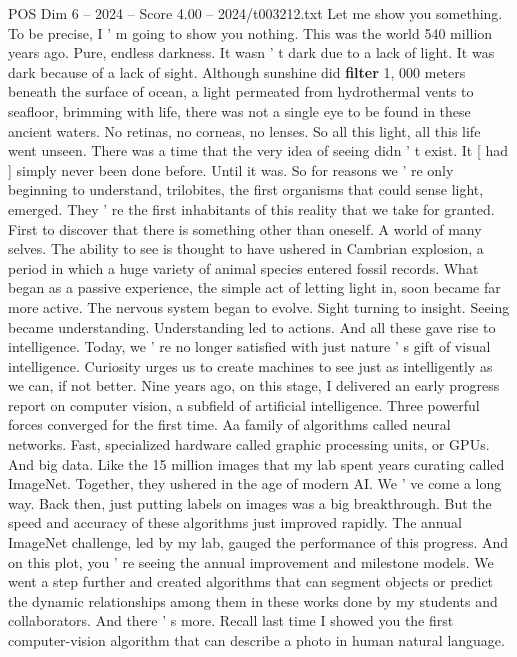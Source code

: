 \begin{textsample}{POS Dim 6 – 2024 – Score 4.00 – 2024/t003212.txt}  \label{ex:f6_pos_074}
Let me show you something.
To be precise, I ' m going to show you nothing.
This was the world 540 million years ago.
Pure, endless darkness.
It wasn ' t dark due to a lack of light.
It was dark because of a lack of sight.
Although sunshine did \textbf{filter} 1, 000 meters beneath the surface of ocean, a light permeated from hydrothermal vents to seafloor, brimming with life, there was not a single eye to be found in these ancient waters.
No retinas, no corneas, no lenses.
So all this light, all this life went unseen.
There was a time that the very idea of seeing didn ' t exist.
It [ had ] simply never been done before.
Until it was.
So for reasons we ' re only beginning to understand, trilobites, the first organisms that could sense light, emerged.
They ' re the first inhabitants of this reality that we take for granted.
First to discover that there is something other than oneself.
A world of many selves.
The ability to see is thought to have ushered in Cambrian explosion, a period in which a huge variety of animal species entered fossil records.
What began as a passive experience, the simple act of letting light in, soon became far more active.
The nervous system began to evolve.
Sight turning to insight.
Seeing became understanding.
Understanding led to actions.
And all these gave rise to intelligence.
Today, we ' re no longer satisfied with just nature ' s gift of visual intelligence.
Curiosity urges us to create machines to see just as intelligently as we can, if not better.
Nine years ago, on this stage, I delivered an early progress report on computer vision, a subfield of artificial intelligence.
Three powerful forces converged for the first time.
Aa family of algorithms called neural networks.
Fast, specialized hardware called graphic processing units, or GPUs.
And big data.
Like the 15 million images that my lab spent years curating called ImageNet.
Together, they ushered in the age of modern AI.
We ' ve come a long way.
Back then, just putting labels on images was a big breakthrough.
But the speed and accuracy of these algorithms just improved rapidly.
The annual ImageNet challenge, led by my lab, gauged the performance of this progress.
And on this plot, you ' re seeing the annual improvement and milestone models.
We went a step further and created algorithms that can segment objects or predict the dynamic relationships among them in these works done by my students and collaborators.
And there ' s more.
Recall last time I showed you the first computer-vision algorithm that can describe a photo in human natural language.

\end{textsample}
